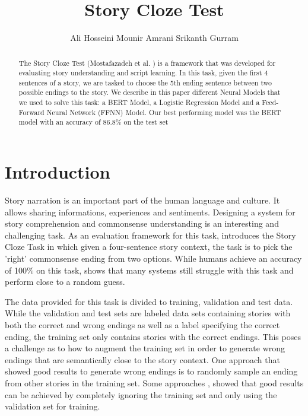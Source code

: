 \documentclass{article}
\title{Story Cloze Test}
\author{Ali Hosseini \qquad Mounir Amrani \qquad Srikanth Gurram}
\begin{document}

\maketitle

\begin{abstract}
The Story Cloze Test (Mostafazadeh et al. \cite{cloze}) is a framework that was developed for evaluating story understanding and script learning. In this task, given the first 4 sentences of a story, we are tasked to choose the 5th ending sentence between two possible endings to the story.
We describe in this paper different Neural Models that we used to solve this task: a BERT Model, a Logistic Regression Model and a Feed-Forward Neural Network (FFNN) Model. Our best performing model was the BERT model with an accuracy of 86.8\% on the test set
\end{abstract}

\section{Introduction}

Story narration is an important part of the human language and culture. It allows sharing informations, experiences and sentiments. Designing a system for story comprehension and commonsense understanding is an interesting and challenging task. As an evaluation framework for this task, \cite{cloze} introduces the Story Cloze Task in which given a four-sentence story context, the task is to pick the 'right' commonsense ending from two options. While humans achieve an accuracy of 100\% on this task, \cite{cloze} shows that many systems still struggle with this task and perform close to a random guess.

The data provided for this task is divided to training, validation and test data. While the validation and test sets are labeled data sets containing stories with both the correct and wrong endings as well as a label specifying the correct ending, the training set only contains stories with the correct endings. This poses a challenge as to how to augment the training set in order to generate wrong endings that are semantically close to the story context. One approach that showed good results to generate wrong endings is to randomly sample an ending from other stories in the training set. Some approaches \cite{UW},\cite{simple_approach} showed that good results can be achieved by completely ignoring the training set and only using the validation set for training.
\end{document}
